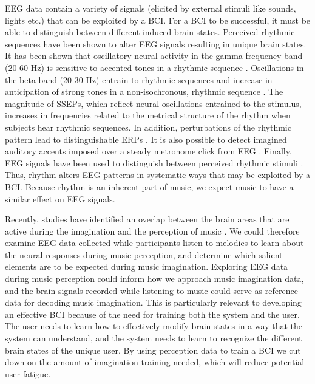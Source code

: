 EEG data contain a variety of signals (elicited by external stimuli like sounds, lights etc.) that can be exploited by a \ac{BCI}. 
For a \ac{BCI} to be successful, it must be able to distinguish between different induced brain states. 
Perceived rhythmic sequences have been shown to alter \ac{EEG} signals resulting in unique brain states.
It has been shown that oscillatory neural activity in the gamma frequency band (20-60 Hz) is sensitive to accented tones in a rhythmic sequence \cite{snyder_gamma-band_2005}.
Oscillations in the beta band (20-30 Hz) entrain to rhythmic sequences \cite{cirelli_beta_2014, merchant_beta_2015} and increase in anticipation of strong tones in a non-isochronous, rhythmic sequence \cite{iversen_top-down_2009,fujioka_beta_2009,fujioka_internalized_2012}.
The magnitude of \acp{SSEP}, which reflect neural oscillations entrained to the stimulus, increases in frequencies related to the metrical structure of the rhythm when subjects hear rhythmic sequences.
In addition, perturbations of the rhythmic pattern lead to distinguishable \acp{ERP} \cite{geiser_early_2009, vlek_shared_2011}.
It is also possible to detect imagined auditory accents imposed over a steady metronome click from EEG \cite{nozaradan_tagging_2011}.
Finally, \ac{EEG} signals have been used to distinguish between perceived rhythmic stimuli \cite{stober2014nips}.
Thus, rhythm alters \ac{EEG} patterns in systematic ways that may be exploited by a \ac{BCI}. 
Because rhythm is an inherent part of music, we expect music to have a similar effect on \ac{EEG} signals. 

Recently, studies have identified an overlap between the brain areas that are active during the imagination and the perception of music \cite{halpern_fmri_2004,Kraemer2005,Herholz2008,herholz_2012}. 
We could therefore examine \ac{EEG} data collected while participants listen to melodies to learn about the neural responses during music perception, and determine which salient elements are to be expected during music imagination.
Exploring EEG data during music perception could inform how we approach music imagination data, and the brain signals recorded while listening to music could serve as reference data for decoding music imagination. 
This is particularly relevant to developing an effective \ac{BCI} because of the need for training both the system and the user.
The user needs to learn how to effectively modify brain states in a way that the system can understand, and the system needs to learn to recognize the different brain states of the unique user.
By using perception data to train a \ac{BCI} we cut down on the amount of imagination training needed, which will reduce potential user fatigue.

